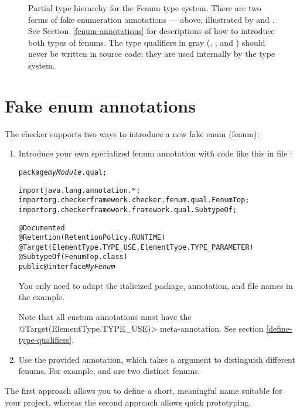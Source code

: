 \begin{figure}
\caption{Partial type hierarchy for the Fenum type system.
There are two forms of fake enumeration annotations --- above, illustrated
by  and .
See Section~\ref{fenum-annotations} for descriptions of how to
introduce both types of fenums. The type qualifiers in gray
(, , and )
should never be written in
source code; they are used internally by the type system.}
\label{fig-fenum-hierarchy}
\end{figure}

\section{Fake enum annotations\label{fenum-annotations}}

The checker supports two ways to introduce a new fake enum (fenum):

\begin{enumerate}
\item Introduce your own specialized fenum annotation with code like this in
file :

\begin{alltt}
package \textit{myModule}.qual;

import java.lang.annotation.*;
import org.checkerframework.checker.fenum.qual.FenumTop;
import org.checkerframework.framework.qual.SubtypeOf;

@Documented
@Retention(RetentionPolicy.RUNTIME)
@Target(\ttlcb{}ElementType.TYPE_USE, ElementType.TYPE_PARAMETER\ttrcb)
@SubtypeOf(FenumTop.class)
public @interface \textit{MyFenum} \ttlcb\ttrcb
\end{alltt}

You only need to adapt the italicized package, annotation, and file names in the example.

Note that all custom annotations must have the
\<@Target(\ttlcb ElementType.TYPE\_USE\ttrcb)> meta-annotation. See section
\ref{define-type-qualifiers}.

\item Use the provided  annotation, which takes a
 argument to distinguish different fenums.
For example,  and  are two distinct fenums.
\end{enumerate}


The first approach allows you to define a short, meaningful name suitable for
your project, whereas the second approach allows quick prototyping.




